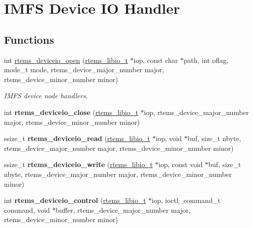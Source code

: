 \hypertarget{group__IMFSDevices}{}\section{I\+M\+FS Device IO Handler}
\label{group__IMFSDevices}
\subsection*{Functions}
\begin{DoxyCompactItemize}
\item 
int \mbox{\hyperlink{group__IMFSDevices_gac8fab61009ee48675f95f5b41accba67}{rtems\+\_\+deviceio\+\_\+open}} (\mbox{\hyperlink{structrtems__libio__tt}{rtems\+\_\+libio\+\_\+t}} $\ast$iop, const char $\ast$path, int oflag, mode\+\_\+t mode, rtems\+\_\+device\+\_\+major\+\_\+number major, rtems\+\_\+device\+\_\+minor\+\_\+number minor)
\begin{DoxyCompactList}\small\item\em I\+M\+FS device node handlers. \end{DoxyCompactList}\item 
\mbox{\label{group__IMFSDevices_ga0c1e4a4debea1a8b4d35fd73a03280aa}} 
int {\bfseries rtems\+\_\+deviceio\+\_\+close} (\mbox{\hyperlink{structrtems__libio__tt}{rtems\+\_\+libio\+\_\+t}} $\ast$iop, rtems\+\_\+device\+\_\+major\+\_\+number major, rtems\+\_\+device\+\_\+minor\+\_\+number minor)
\item 
\mbox{\label{group__IMFSDevices_ga06082bea57c98441e2efa502d16f114d}} 
ssize\+\_\+t {\bfseries rtems\+\_\+deviceio\+\_\+read} (\mbox{\hyperlink{structrtems__libio__tt}{rtems\+\_\+libio\+\_\+t}} $\ast$iop, void $\ast$buf, size\+\_\+t nbyte, rtems\+\_\+device\+\_\+major\+\_\+number major, rtems\+\_\+device\+\_\+minor\+\_\+number minor)
\item 
\mbox{\label{group__IMFSDevices_gaa7f95d04ca6d98bd78590f06fd2678b1}} 
ssize\+\_\+t {\bfseries rtems\+\_\+deviceio\+\_\+write} (\mbox{\hyperlink{structrtems__libio__tt}{rtems\+\_\+libio\+\_\+t}} $\ast$iop, const void $\ast$buf, size\+\_\+t nbyte, rtems\+\_\+device\+\_\+major\+\_\+number major, rtems\+\_\+device\+\_\+minor\+\_\+number minor)
\item 
\mbox{\label{group__IMFSDevices_ga081bd1e9224007d0169c393ce6e923c7}} 
int {\bfseries rtems\+\_\+deviceio\+\_\+control} (\mbox{\hyperlink{structrtems__libio__tt}{rtems\+\_\+libio\+\_\+t}} $\ast$iop, ioctl\+\_\+command\+\_\+t command, void $\ast$buffer, rtems\+\_\+device\+\_\+major\+\_\+number major, rtems\+\_\+device\+\_\+minor\+\_\+number minor)
\end{DoxyCompactItemize}


